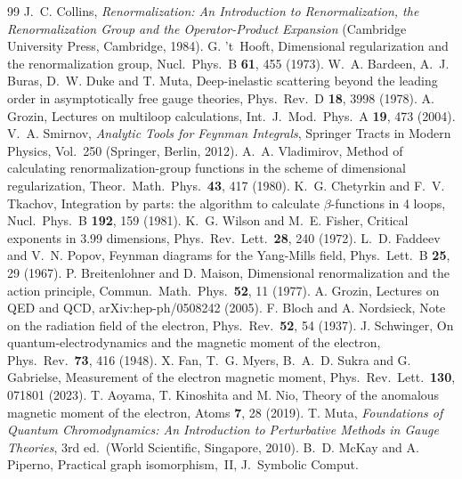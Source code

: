 \documentclass[11pt,a4paper]{article}
\begin{document}
\begin{thebibliography}{99}
 J.~C. Collins, \emph{Renormalization: An Introduction to Renormalization, the Renormalization Group and the Operator-Product Expansion} (Cambridge University Press, Cambridge, 1984).
 G. 't~Hooft, Dimensional regularization and the renormalization group, Nucl.\ Phys.\ B \textbf{61}, 455 (1973).
 W.~A. Bardeen, A.~J. Buras, D.~W. Duke and T. Muta, Deep-inelastic scattering beyond the leading order in asymptotically free gauge theories, Phys.\ Rev.\ D \textbf{18}, 3998 (1978).
 A. Grozin, Lectures on multiloop calculations, Int.\ J.\ Mod.\ Phys.\ A \textbf{19}, 473 (2004).
 V.~A. Smirnov, \emph{Analytic Tools for Feynman Integrals}, Springer Tracts in Modern Physics, Vol.~250 (Springer, Berlin, 2012).
 A.~A. Vladimirov, Method of calculating renormalization-group functions in the scheme of dimensional regularization, Theor.\ Math.\ Phys.\ \textbf{43}, 417 (1980).
 K.~G. Chetyrkin and F.~V. Tkachov, Integration by parts: the algorithm to calculate $\beta$-functions in 4 loops, Nucl.\ Phys.\ B \textbf{192}, 159 (1981).
 K.~G. Wilson and M.~E. Fisher, Critical exponents in 3.99 dimensions, Phys.\ Rev.\ Lett.\ \textbf{28}, 240 (1972).
 L.~D. Faddeev and V.~N. Popov, Feynman diagrams for the Yang-Mills field, Phys.\ Lett.\ B \textbf{25}, 29 (1967).
 P. Breitenlohner and D. Maison, Dimensional renormalization and the action principle, Commun.\ Math.\ Phys.\ \textbf{52}, 11 (1977).
 A. Grozin, Lectures on QED and QCD, arXiv:hep-ph/0508242 (2005).
 F. Bloch and A. Nordsieck, Note on the radiation field of the electron, Phys.\ Rev.\ \textbf{52}, 54 (1937).
 J. Schwinger, On quantum-electrodynamics and the magnetic moment of the electron, Phys.\ Rev.\ \textbf{73}, 416 (1948).
 X. Fan, T.~G. Myers, B.~A.~D. Sukra and G. Gabrielse, Measurement of the electron
  magnetic moment, Phys.\ Rev.\ Lett.\ \textbf{130}, 071801 (2023).
 T. Aoyama, T. Kinoshita and M. Nio, Theory of the anomalous magnetic moment of the electron, Atoms \textbf{7}, 28 (2019).
 T. Muta, \emph{Foundations of Quantum Chromodynamics: An Introduction to Perturbative Methods in Gauge Theories}, 3rd ed.\ (World Scientific, Singapore, 2010).
 B.~D. McKay and A. Piperno, Practical graph isomorphism,~II, J.\ Symbolic Comput.\

\end{thebibliography}
\end{document}

